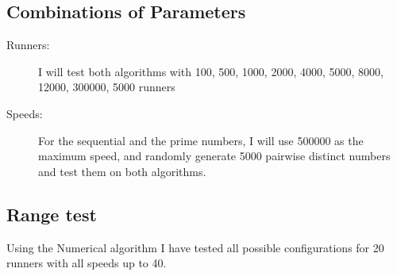 \subsection{Combinations of Parameters} 

\begin{description}
\item[Runners:] I will test both algorithms with 100, 500, 1000, 2000, 4000, 5000, 8000, 12000, 300000, 5000 runners 
\item[Speeds:] For the sequential and the prime numbers, I will use
  500000 as the maximum speed, and randomly generate 5000 pairwise distinct numbers and test them on both algorithms.
\end{description}

\subsection{Range test}
Using the Numerical algorithm I have tested all possible configurations for 20 runners with all speeds up to 40. 
